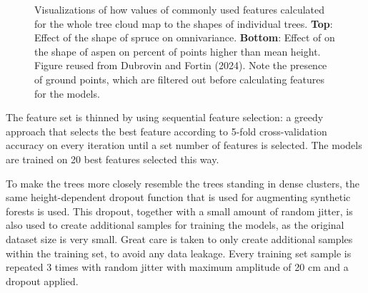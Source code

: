 \begin{figure}
\caption[Visualizations of tree shapes at different ends of feature value ranges.]{\label{fig-feature-ranges}Visualizations of how values of
commonly used features calculated for the whole tree cloud map to the
shapes of individual trees. \textbf{Top}: Effect of the shape of spruce
on omnivariance. \textbf{Bottom}: Effect of on the shape of aspen on
percent of points higher than mean height. Figure reused from Dubrovin
and Fortin (2024). Note the presence of ground points, which are
filtered out before calculating features for the models.}
\end{figure}

The feature set is thinned by using sequential feature selection: a greedy approach that selects the best feature according to 5-fold cross-validation accuracy on every iteration until a set number of features is selected.
The models are trained on 20 best features selected this way.

To make the trees more closely resemble the trees standing in dense clusters, the same height-dependent dropout function that is used for augmenting synthetic forests is used.
This dropout, together with a small amount of random jitter, is also used to create additional samples for training the models, as the original dataset size is very small.
Great care is taken to only create additional samples within the training set, to avoid any data leakage.
Every training set sample is repeated 3 times with random jitter with maximum amplitude of 20 cm and a dropout applied.

